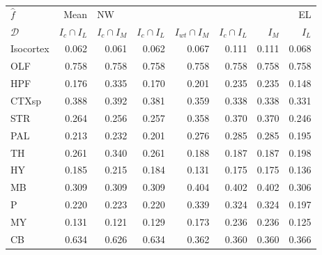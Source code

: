 \begin{table}[H]
\small
\begin{tabular}{lrrrrrrr}
\toprule
$\widehat f$ &           Mean & \multicolumn{5}{l}{NW} &     EL \\
$\mathcal D$ & $I_c \cap I_L$ & $I_c \cap I_M$ & $I_c \cap I_L$ & $I_{wt} \cap I_M$ & $I_c \cap I_L$ &  $I_M$ &  $I_L$ \\
\midrule
Isocortex &          0.062 &          0.061 &          0.062 &             0.067 &          0.111 &  0.111 &  0.068 \\
OLF       &          0.758 &          0.758 &          0.758 &             0.758 &          0.758 &  0.758 &  0.758 \\
HPF       &          0.176 &          0.335 &          0.170 &             0.201 &          0.235 &  0.235 &  0.148 \\
CTXsp     &          0.388 &          0.392 &          0.381 &             0.359 &          0.338 &  0.338 &  0.331 \\
STR       &          0.264 &          0.256 &          0.257 &             0.358 &          0.370 &  0.370 &  0.246 \\
PAL       &          0.213 &          0.232 &          0.201 &             0.276 &          0.285 &  0.285 &  0.195 \\
TH        &          0.261 &          0.340 &          0.261 &             0.188 &          0.187 &  0.187 &  0.198 \\
HY        &          0.185 &          0.215 &          0.184 &             0.131 &          0.175 &  0.175 &  0.136 \\
MB        &          0.309 &          0.309 &          0.309 &             0.404 &          0.402 &  0.402 &  0.306 \\
P         &          0.220 &          0.223 &          0.220 &             0.339 &          0.324 &  0.324 &  0.197 \\
MY        &          0.131 &          0.121 &          0.129 &             0.173 &          0.236 &  0.236 &  0.125 \\
CB        &          0.634 &          0.626 &          0.634 &             0.362 &          0.360 &  0.360 &  0.366 \\
\bottomrule
\end{tabular}
\end{table}


